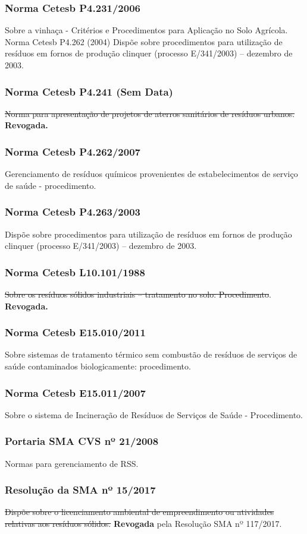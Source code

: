 \begin{subapend}
\begin{subsubapend}
		\subsubsection{Norma Cetesb P4.231/2006}
		Sobre a vinhaça - Critérios e Procedimentos para Aplicação no Solo Agrícola. Norma Cetesb P4.262 (2004) Dispõe sobre procedimentos para utilização de resíduos em fornos de produção clinquer (processo E/341/2003) – dezembro de 2003.
		\subsubsection{Norma Cetesb P4.241 (Sem Data)}
		\sout{Norma para apresentação de projetos de aterros sanitários de resíduos urbanos.} \textbf{Revogada.} 
		\subsubsection{Norma Cetesb P4.262/2007}
		Gerenciamento de resíduos químicos provenientes de estabelecimentos de serviço de saúde - procedimento.
		\subsubsection{Norma Cetesb P4.263/2003}
		Dispõe sobre procedimentos para utilização de resíduos em fornos de produção clinquer (processo E/341/2003) – dezembro de 2003.
		\subsubsection{Norma Cetesb L10.101/1988} 
		\sout{Sobre os resíduos sólidos industriais – tratamento no solo: Procedimento}. \textbf{Revogada.}
		\subsubsection{Norma Cetesb E15.010/2011}
		Sobre sistemas de tratamento térmico sem combustão de resíduos de serviços de saúde contaminados biologicamente: procedimento.
		\subsubsection{Norma Cetesb E15.011/2007}
		Sobre o sistema de Incineração de Resíduos de Serviços de Saúde - Procedimento.
		\subsubsection{Portaria SMA  CVS nº 21/2008}
		Normas para gerenciamento de RSS.
		\subsubsection{Resolução da SMA nº 15/2017}
		\sout{Dispõe sobre o licenciamento ambiental de empreendimento ou atividades relativas aos resíduos sólidos.} \textbf{Revogada} pela Resolução SMA nº 117/2017.

\end{subsubapend}
\end{subapend}
